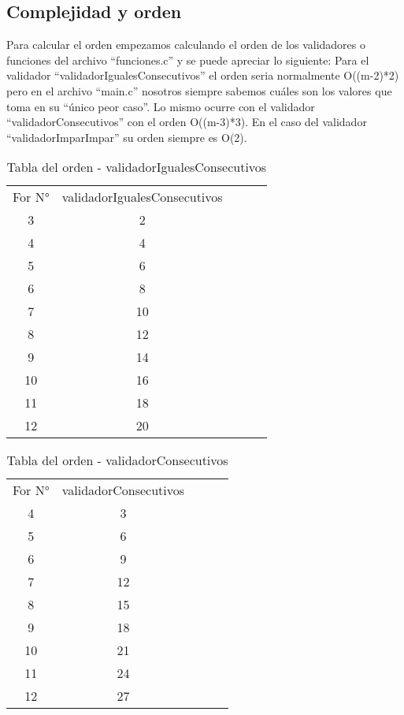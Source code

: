 \documentclass[9pt,twocolumn,twoside]{optica}
\begin{document}
\subsection{Complejidad y orden}
Para calcular el orden empezamos calculando el orden de los validadores o funciones del archivo “funciones.c” y se puede apreciar lo siguiente:
Para el validador “validadorIgualesConsecutivos” el orden seria normalmente O((m-2)*2) pero en el archivo “main.c” nosotros siempre sabemos cuáles son los valores que toma en su “único peor caso”. Lo mismo ocurre con el validador “validadorConsecutivos” con el orden O((m-3)*3). En el caso del validador “validadorImparImpar” su orden siempre es O(2).
\begin{table}
\centering
\caption{Tabla del orden - validadorIgualesConsecutivos}
\label{my-label}
\begin{tabular}{|c|c|lll}
\cline{1-2}
For N° & validadorIgualesConsecutivos &  &  &  \\ \cline{1-2}
3         & 2         &  &  &  \\ \cline{1-2}
4         & 4         &  &  &  \\ \cline{1-2}
5         & 6         &  &  &  \\ \cline{1-2}
6         & 8         &  &  &  \\ \cline{1-2}
7         & 10         &  &  &  \\ \cline{1-2}
8         & 12         &  &  &  \\ \cline{1-2}
9         & 14         &  &  &  \\ \cline{1-2}
10         & 16         &  &  &  \\ \cline{1-2}
11         & 18         &  &  &  \\ \cline{1-2}
12         & 20         &  &  &  \\ \cline{1-2}
\end{tabular}
\end{table}
\begin{table}
\centering
\caption{Tabla del orden - validadorConsecutivos}
\label{my-label}
\begin{tabular}{|c|c|lll}
\cline{1-2}
For N° & validadorConsecutivos &  &  &  \\ \cline{1-2}
4         & 3         &  &  &  \\ \cline{1-2}
5         & 6         &  &  &  \\ \cline{1-2}
6         & 9         &  &  &  \\ \cline{1-2}
7         & 12         &  &  &  \\ \cline{1-2}
8         & 15         &  &  &  \\ \cline{1-2}
9         & 18         &  &  &  \\ \cline{1-2}
10         & 21         &  &  &  \\ \cline{1-2}
11         & 24         &  &  &  \\ \cline{1-2}
12         & 27         &  &  &  \\ \cline{1-2}
\end{tabular}
\end{table}
\end{document}
